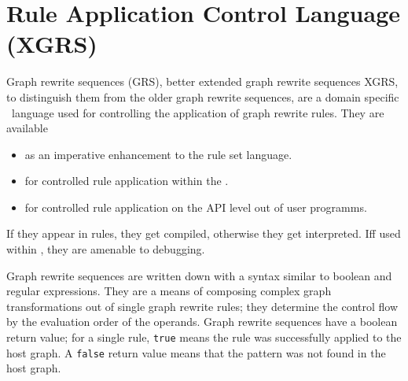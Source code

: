 \chapter{Rule Application Control Language (XGRS)}
\label{cha:xgrs}

Graph rewrite sequences (GRS), better extended graph rewrite sequences XGRS, to distinguish them from the older graph rewrite sequences, are a domain specific \GrG~language used for controlling the application of graph rewrite rules. 
They are available
\begin{itemize}
\item as an imperative enhancement to the rule set language.
\item for controlled rule application within the \GrShell.
\item for controlled rule application on the API level out of user programms.
\end{itemize}

If they appear in rules, they get compiled, otherwise they get interpreted.
Iff used within \GrShell, they are amenable to debugging.

Graph rewrite sequences are written down with a syntax similar to boolean and regular expressions.
They are a means of composing complex graph transformations out of single graph rewrite rules; 
they determine the control flow by the evaluation order of the operands.
Graph rewrite sequences have a boolean return value; for a single rule, \texttt{true} means the rule was successfully applied to the host graph.
A \texttt{false} return value means that the pattern was not found in the host graph. 

